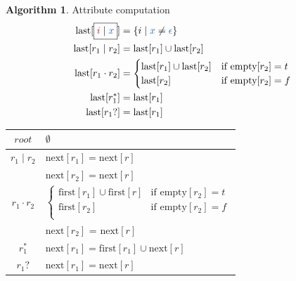 \documentclass[10pt, landscape]{article}
\theoremstyle{definition}
\newtheorem{algorithm}{Algorithm}[section]
\newcommand{\AttrOf}[2]{\text{#1}[#2]}
\newcommand{\FirstAttr}[1]{\AttrOf{first}{#1}}
\newcommand{\EmptyAttr}[1]{\AttrOf{empty}{#1}}
\newcommand{\LastAttr}[1]{\AttrOf{last}{#1}}
\newcommand{\NextAttr}[1]{\AttrOf{next}{#1}}
\newcommand{\termcolor}{NavyBlue}
\newcommand{\termX}{\textcolor{\termcolor}{x}}
\newcommand{\termEps}{\textcolor{\termcolor}{\epsilon}}
\begin{document}
\begin{multicols*}{3}
{\begin{algorithm}{Attribute computation}
    \begin{align*}
      \LastAttr{\Leaf{i}{\termX}} &=  \{ i \mid \termX \neq \termEps \} \\
      \LastAttr{r_{1} \mid r_{2}} &= \LastAttr{r_{1}} \cup \LastAttr{r_{2}} \\
      \LastAttr{r_{1} \cdot r_{2}} &= \begin{cases}
                                          \LastAttr{r_{1}} \cup \LastAttr{r_{2}} & \text{if } \EmptyAttr{r_{2}} = t \\
                                          \LastAttr{r_{2}}                          & \text{if } \EmptyAttr{r_{2}} = f
                                        \end{cases} \\
      \LastAttr{r_{1}^{*}} &= \LastAttr{r_{1}} \\
      \LastAttr{r_{1}?} &= \LastAttr{r_{1}}
    \end{align*}

    \vspace{.25in}

    \begin{tabular}{c  l}
      $root$ & $\emptyset$ \\
      \midrule
      $r_{1} \mid r_{2}$    & $\NextAttr{r_{1}} = \NextAttr{r}$ \\
                        & $\NextAttr{r_{2}} = \NextAttr{r}$ \\

      \midrule

      $r_{1} \cdot r_{2}$ & $\begin{cases}
                              \FirstAttr{r_{1}} \cup \FirstAttr{r}   & \text{if } \EmptyAttr{r_{2}} = t \\
                              \FirstAttr{r_{2}}                      & \text{if } \EmptyAttr{r_{2}} = f \\
                            \end{cases}$ \\
                        & $\NextAttr{r_{2}}$ = $\NextAttr{r}$ \\
      \midrule
      $r_{1}^{*}$         & $\NextAttr{r_{1}} = \FirstAttr{r_{1}} \cup \NextAttr{r}$ \\
      \midrule
      $r_{1}?$            & $\NextAttr{r_{1}} =\NextAttr{r}$ \\
    \end{tabular}

  \end{algorithm}
}


\end{multicols*}
\end{document}
